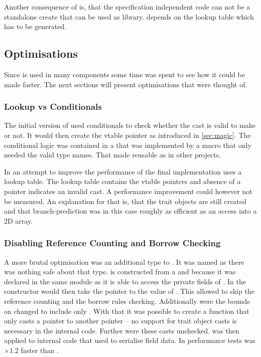 \documentclass[thesis]{subfiles}
\begin{document}
    Another consequence of \PtrT is, that the specification independent code can not be a standalone create that can be used as library.
    \PtrT depends on the lookup table which has to be generated.

  \subsection{Optimisations}
    Since \PtrT is used in many components some time was spent to see how it could be made faster.
    The next sections will present optimisations that were thought of.

    \subsubsection{Lookup vs Conditionals}
      The initial version of \PtrT used conditionals to check whether the cast is valid to make or not.
      It would then create the vtable pointer as introduced in \autoref{sec:magic}.
      The conditional logic was contained in a \trait that was implemented by a macro that only needed the valid type names.
      That made \PtrT reusable as in other projects.

      In an attempt to improve the performance of \cast the final implementation uses a lookup table.
      The lookup table contains the vtable pointers and absence of a pointer indicates an invalid cast.
      A performance improvement could however not be measured.
      An explanation for that is, that the trait objects are still created and that branch-prediction was in this case roughly as efficient as an access into a 2D array.

    \subsubsection{Disabling Reference Counting and Borrow Checking}
      A more brutal optimisation was an additional type to \PtrT.
      It was named \HazardPtrT as there was nothing safe about that type.
      \HazardPtrT is constructed from a \PtrT and because it was declared in the same module as \PtrT it is able to access the private fields of \PtrT.
      In the constructor \HazardPtrT would then take the pointer to the value of \PtrT.
      This allowed to skip the reference counting and the borrow rules checking.
      Additionally were the bounds on \HazardPtrT changed to include only \structs.
      With that it was possible to create a \cast function that only casts a pointer to another pointer -- no support for trait object casts is necessary in the internal code.
      Further were these casts unchecked.
      \HazardPtrT was then applied to internal code that used \PtrT to serialise field data.
      In performance tests \HazardPtrT was $\times 1.2$ faster than \PtrT.
\end{document}
